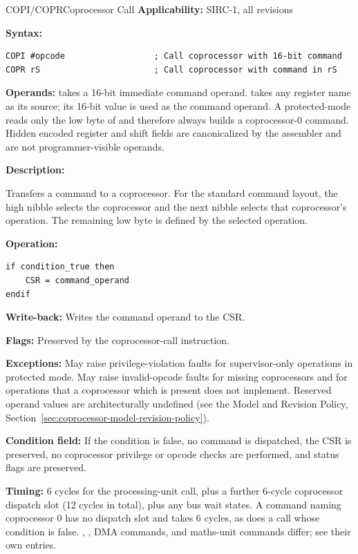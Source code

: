 \begin{instructionbox}{COPI/COPR}{Coprocessor Call}
	\textbf{Applicability:} SIRC-1, all revisions

	\textbf{Syntax:}
	\begin{lstlisting}
COPI #opcode                  ; Call coprocessor with 16-bit command
COPR rS                       ; Call coprocessor with command in rS
\end{lstlisting}

	\textbf{Operands:}  takes a 16-bit immediate command operand.  takes any register
	name as its source; its 16-bit value is used as the command operand. A protected-mode  reads
	only the low byte of  and therefore always builds a coprocessor-0 command. Hidden encoded register and
	shift fields are canonicalized by the assembler and are not programmer-visible operands.

	\textbf{Description:}

	Transfers a command to a coprocessor. For the standard command layout, the high nibble selects the coprocessor and the
	next nibble selects that coprocessor's operation. The remaining low byte is defined by the selected operation.

	\textbf{Operation:}
	\begin{verbatim}
if condition_true then
    CSR = command_operand
endif
\end{verbatim}

	\textbf{Write-back:} Writes the command operand to the CSR.

	\textbf{Flags:} Preserved by the coprocessor-call instruction.

	\textbf{Exceptions:} May raise privilege-violation faults for supervisor-only operations in protected mode. May raise
	invalid-opcode faults for missing coprocessors and for operations that a coprocessor which is present does not
	implement. Reserved operand values are architecturally undefined (see the Model and Revision Policy,
	Section~\ref{sec:coprocessor-model-revision-policy}).

	\textbf{Condition field:} If the condition is false, no command is dispatched, the CSR is preserved,
	no coprocessor privilege or opcode checks are performed, and status flags are preserved.

	\textbf{Timing:} 6 cycles for the processing-unit call, plus a further 6-cycle coprocessor dispatch slot (12
	cycles in total), plus any bus wait states. A command naming coprocessor 0 has no dispatch slot and takes 6 cycles, as
	does a call whose condition is false. , , DMA commands, and maths-unit commands differ;
	see their own entries.


\end{instructionbox}
